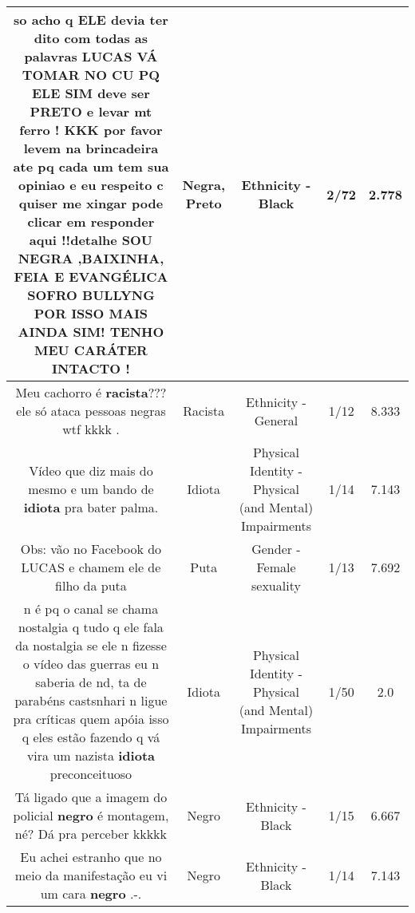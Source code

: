 \documentclass[11pt]{article}
\newlength\mylength
\begin{document}
\begin{center}
\begin{longtable}{|C{.65\mylength}|C{.30\mylength}|C{.12\mylength}|C{.12\mylength}|C{.12\mylength}|}
  \small so acho q ELE devia ter dito com todas as palavras  LUCAS VÁ TOMAR NO CU PQ ELE SIM deve ser  \textbf{PRETO}  e levar mt ferro ! KKK por favor levem na brincadeira ate pq cada um tem sua opiniao e eu respeito c quiser me xingar pode clicar em responder aqui !!detalhe SOU \textbf{NEGRA} ,BAIXINHA, FEIA E EVANGÉLICA   SOFRO BULLYNG POR ISSO MAIS AINDA SIM! TENHO MEU CARÁTER INTACTO !\normalsize   & Negra, Preto & Ethnicity - Black & 2/72 & 2.778 \\  \hline
  \small Meu cachorro é \textbf{racista}??? ele só ataca pessoas negras wtf kkkk .\normalsize   & Racista & Ethnicity - General & 1/12 & 8.333 \\  \hline
  \small Vídeo que diz mais do mesmo e um bando de \textbf{idiota} pra bater palma.\normalsize   & Idiota & Physical Identity - Physical (and Mental) Impairments & 1/14 & 7.143 \\  \hline
  \small Obs: vão no Facebook do LUCAS e chamem ele de filho da puta\normalsize   & Puta & Gender - Female sexuality & 1/13 & 7.692 \\  \hline
  \small n é pq o canal se chama nostalgia q tudo q ele fala da nostalgia se ele n fizesse o vídeo das guerras eu n saberia de nd, ta de parabéns castsnhari n ligue pra críticas quem apóia isso q eles estão fazendo q vá vira um nazista \textbf{idiota} preconceituoso\normalsize   & Idiota & Physical Identity - Physical (and Mental) Impairments & 1/50 & 2.0 \\  \hline
  \small Tá ligado que a imagem do policial \textbf{negro} é montagem, né? Dá pra perceber kkkkk\normalsize   & Negro & Ethnicity - Black & 1/15 & 6.667 \\  \hline
  \small Eu achei estranho que no meio da manifestação eu vi um cara \textbf{negro} .-.\normalsize   & Negro & Ethnicity - Black & 1/14 & 7.143 \\  \hline

\end{longtable}
\end{center}
\end{document}
